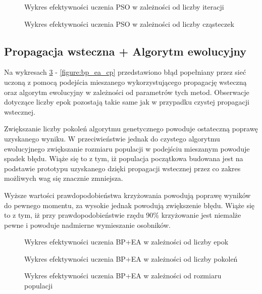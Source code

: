 \documentclass[11pt,a4paper,oneside]{report}
\begin{document}
\begin{figure}[H]
	\caption{Wykres efektywności uczenia PSO w zależności od liczby iteracji \label{figure:pso_generations}}
	
\end{figure}

\begin{figure}[H]
	\caption{Wykres efektywności uczenia PSO w zależności od liczby cząsteczek \label{figure:pso_population}}
	
\end{figure}

\subsection{Propagacja wsteczna + Algorytm ewolucyjny}

Na wykresach \ref{figure:bp_ea_epochs} - \ref{figure:bp_ea_cp} przedstawiono błąd popełniany przez sieć uczoną z pomocą podejścia mieszanego wykorzystującego propagację wsteczną oraz algorytm ewolucyjny w zależności od parametrów tych metod. Obserwacje dotyczące liczby epok pozostają takie same jak w przypadku czystej propagacji wstecznej. 

Zwiększanie liczby pokoleń algorytmu genetycznego powoduje ostateczną poprawę uzyskanego wyniku. W przeciwieństwie jednak do czystego algorytmu ewolucyjnego zwiększanie rozmiaru populacji w podejściu mieszanym powoduje spadek błędu. Wiąże się to z tym, iż populacja początkowa budowana jest na podstawie prototypu uzyskanego dzięki propagacji wstecznej przez co zakres możliwych wag się znacznie zmniejsza. 

Wyższe wartości prawdopodobieństwa krzyżowania powodują poprawę wyników do pewnego momentu, za wysokie jednak powodują zwiększenie błędu. Wiąże się to z tym, iż przy prawdopodobieństwie rzędu 90\% krzyżowanie jest niemalże pewne i powoduje nadmierne wymieszanie osobników.

\begin{figure}[H]
	\caption{Wykres efektywności uczenia BP+EA w zależności od liczby epok \label{figure:bp_ea_epochs}}
	
\end{figure}

\begin{figure}[H]
	\caption{Wykres efektywności uczenia BP+EA w zależności od liczby pokoleń \label{figure:bp_ea_generations}}
	
\end{figure}

\begin{figure}[H]
	\caption{Wykres efektywności uczenia BP+EA w zależności od rozmiaru populacji \label{figure:bp_ea_population}}
	
\end{figure}
\end{document}
